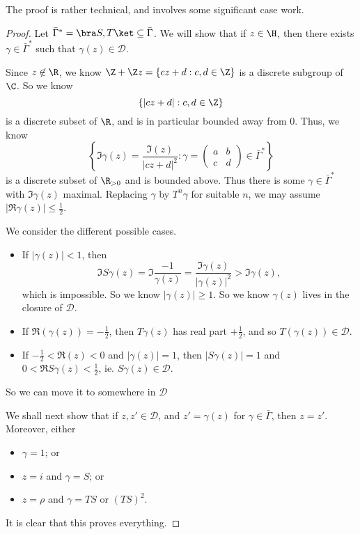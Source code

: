\documentclass[a4paper]{article}
\begin{document}
The proof is rather technical, and involves some significant case work.
\begin{proof}
  Let $\bar{\Gamma}^* = \bra S, T\ket \subseteq \bar{\Gamma}$. We will show that if $z \in \H$, then there exists $\gamma \in \bar\Gamma^*$ such that $\gamma(z) \in \mathcal{D}$.

  Since $z \not \in \R$, we know $\Z + \Z z = \{cz + d: c, d \in \Z\}$ is a discrete subgroup of $\C$. So we know
  \[
    \{|cz + d|: c, d \in \Z\}
  \]
  is a discrete subset of $\R$, and is in particular bounded away from $0$. Thus, we know
  \[
    \left\{\Im \gamma(z) = \frac{\Im (z)}{|cz + d|^2}: \gamma =
    \begin{pmatrix}
      a & b\\
      c & d
    \end{pmatrix} \in \bar\Gamma^*\right\}
  \]
  is a discrete subset of $\R_{>0}$ and is bounded above. Thus there is some $\gamma \in \bar{\Gamma}^*$ with $\Im \gamma(z)$ maximal. Replacing $\gamma$ by $T^n \gamma$ for suitable $n$, we may assume $|\Re \gamma(z)| \leq \frac{1}{2}$.

  We consider the different possible cases.
  \begin{itemize}
    \item If $|\gamma(z)| < 1$, then
      \[
        \Im S \gamma(z) = \Im \frac{-1}{\gamma(z)} = \frac{\Im \gamma(z)}{|\gamma(z)|^2} > \Im \gamma(z),
      \]
      which is impossible. So we know $|\gamma(z)| \geq 1$. So we know $\gamma(z)$ lives in the closure of $\mathcal{D}$.

    \item If $\Re(\gamma(z)) = -\frac{1}{2}$, then $T \gamma(z)$ has real part $+\frac{1}{2}$, and so $T(\gamma(z)) \in \mathcal{D}$.

    \item If $-\frac{1}{2} < \Re(z) < 0$ and $|\gamma(z)| = 1$, then $|S\gamma(z)| = 1$ and $0 < \Re S\gamma(z) < \frac{1}{2}$, ie. $S \gamma(z) \in \mathcal{D}$.
  \end{itemize}
  So we can move it to somewhere in $\mathcal{D}$

  \separator

  We shall next show that if $z, z' \in \mathcal{D}$, and $z' = \gamma(z)$ for $\gamma \in \bar{\Gamma}$, then $z = z'$. Moreover, either
  \begin{itemize}
    \item $\gamma = 1$; or
    \item $z = i$ and $\gamma = S$; or
    \item $z = \rho$ and $\gamma = TS$ or $(TS)^2$. 
  \end{itemize}
  It is clear that this proves everything.


\end{proof}
\end{document}
